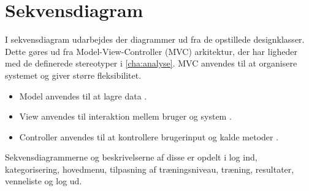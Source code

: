 \section{Sekvensdiagram}
I sekvensdiagram udarbejdes der diagrammer ud fra de opstillede designklasser. Dette gøres ud fra Model-View-Controller (MVC) arkitektur, der har ligheder med de definerede stereotyper i \autoref{cha:analyse}. MVC anvendes til at organisere systemet og giver større fleksibilitet. 

\begin{itemize}
\item Model anvendes til at lagre data \cite{Brahma2015}.
\item View anvendes til interaktion mellem bruger og system \cite{Brahma2015}.
\item Controller anvendes til at kontrollere brugerinput og kalde metoder \cite{Brahma2015}.
\end{itemize}

\noindent
Sekvensdiagrammerne og beskrivelserne af disse er opdelt i log ind, kategorisering, hovedmenu, tilpasning af træningsniveau, træning, resultater, venneliste og log ud.  

